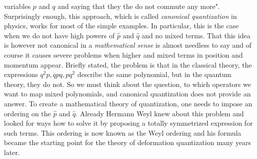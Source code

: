 variables $p$ and $q$ and saying that they the do not commute any more". 
Surprisingly enough, this approach, which is called \emph{canonical quantization} 
in physics, works for most of the simple examples. In particular, this is the 
case when we do not have high powers of $\hat p$ and $\hat q$ and no 
mixed terms. That this idea is however not canonical in a \emph{mathematical 
sense} is almost needless to say and of course it causes severe problems when 
higher and mixed terms in position and momentum appear. Briefly stated, the 
problem is that in the classical theory, the expressions $q^2p, qpq, pq^2$ 
describe the same polynomial, but in the quantum theory, they do not. So we must 
think about the question, to which operators we want to map mixed polynomials, and 
canonical quantization does not provide an answer. To create a mathematical theory 
of quantization, one needs to impose an ordering on the $\hat p$ and $\hat q$. 
Already Hermann Weyl knew about this problem and looked for ways how to solve it 
by proposing a totally symmetrized expression \cite{weyl:1931a} for such terms. 
This ordering is now known as the Weyl ordering and his formula became the 
starting point for the theory of deformation quantization many years later.


